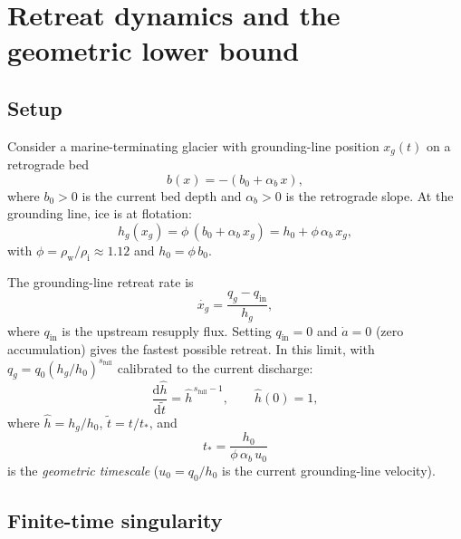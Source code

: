 \documentclass[11pt]{article}
\newcommand{\dd}{\mathrm{d}}
\newcommand{\qg}{q_g}
\newcommand{\hg}{h_g}
\newcommand{\hhat}{\hat{h}}
\newcommand{\xg}{x_g}
\newcommand{\rhoi}{\rho_{\mathrm{i}}}
\newcommand{\rhow}{\rho_{\mathrm{w}}}
\newcommand{\tdim}{\tilde{t}}
\begin{document}
\section{Retreat dynamics and the geometric lower bound}
\label{sec:lower_bound}

\subsection{Setup}

Consider a marine-terminating glacier with grounding-line position $\xg(t)$ on a retrograde bed
\begin{equation}
	b(x) = -(b_0 + \alpha_b\, x),
	\label{eq:bed}
\end{equation}
where $b_0 > 0$ is the current bed depth and $\alpha_b > 0$ is the retrograde slope. At the grounding line, ice is at flotation:
\begin{equation}
	\hg(\xg) = \phi\,(b_0 + \alpha_b\, \xg) = h_0 + \phi\,\alpha_b\, \xg,
	\label{eq:flotation}
\end{equation}
with $\phi = \rhow/\rhoi \approx 1.12$ and $h_0 = \phi\, b_0$.

The grounding-line retreat rate is \citep{Schoof2012}
\begin{equation}
	\dot{\xg} = \frac{\qg - q_{\mathrm{in}}}{\hg},
	\label{eq:retreat_rate}
\end{equation}
where $q_{\mathrm{in}}$ is the upstream resupply flux. Setting $q_{\mathrm{in}} = 0$ and $\dot{a} = 0$ (zero accumulation) gives the fastest possible retreat. In this limit, with $\qg = q_0(\hg/h_0)^{s_{\mathrm{full}}}$ calibrated to the current discharge:
\begin{equation}
	\frac{\dd\hhat}{\dd\tdim} = \hhat^{\,s_{\mathrm{full}}-1},
	\qquad \hhat(0) = 1,
	\label{eq:hhat_ode}
\end{equation}
where $\hhat = \hg/h_0$, $\tdim = t/t_*$, and
\begin{equation}
	t_* = \frac{h_0}{\phi\,\alpha_b\,u_0}
	\label{eq:tstar}
\end{equation}
is the \emph{geometric timescale} ($u_0 = q_0/h_0$ is the current grounding-line velocity).

\subsection{Finite-time singularity}
\end{document}
